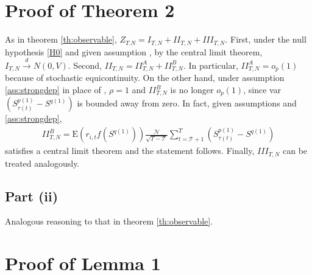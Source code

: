 \section{Proof of Theorem 2}
\label{Proof of th:strongdep}

As in theorem \ref{th:observable}, $Z_{T.N}=I_{T,N}+II_{T,N}+III_{T,N}$. First, under the null hypothesis \ref{H0} and given assumption , by the central limit theorem, $I_{T,N}\overset{d}{\rightarrow } N\left( 0,V\right)$. Second, $II_{T,N}=II_{T,N}^{A}+II_{T,N}^{B}$. In particular, $II_{T,N}^{A}=o_{p}(1)$ because of stochastic equicontinuity. On the other hand, under assumption \ref{ass:strongdep} in place of , $\rho =1$ and $II_{T,N}^{B}$ is no longer $o_{p}(1)$, since var $\left( S_{\tau(t)}^{p(1)}-S^{q(1)} \right) $ is bounded away from zero. In fact, given assumptions  and \ref{ass:strongdep},
\begin{align*}
II_{T,N}^{B}=\mathrm{E}\left( r_{i,t} f\left( S^{q(1)}\right) \right) \frac{\mathcal{N}}{\sqrt{T - \mathcal{T}}} \sum_{t=\mathcal{T}+1}^{T}\left( S_{\tau(t)}^{p(1)}-S^{q(1)} \right) 
\end{align*}
satisfies a central limit theorem and the statement follows. Finally, $III_{T,N}$ can be treated analogously.

\subsection{Part (ii)}

Analogous reasoning to that in theorem \ref{th:observable}.



\section{Proof of Lemma 1}
\label{Proof of lem:trimerror}

